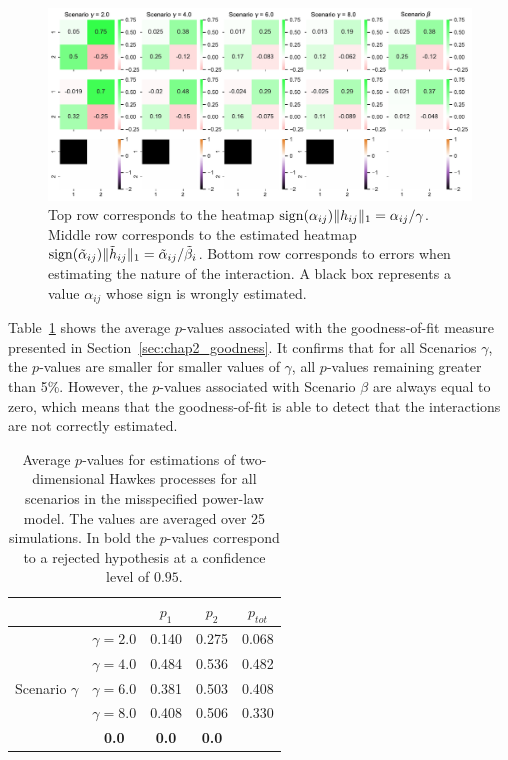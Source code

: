 {\begin{figure}[!ht]
     \centering
     \includegraphics[width=0.9\linewidth]{images/chapter3/heatmap_powerlaw_both.pdf}
     \caption{Top row corresponds to the heatmap $\operatorname{sign}(\alpha_{ij})\| h_{ij} \|_1 = \alpha_{ij}/\gamma$. Middle row corresponds to the estimated heatmap $\operatorname{sign}(\tilde \alpha_{ij})\| \tilde h_{ij}\|_1 = \tilde \alpha_{ij}/ \tilde\beta_{i}$. Bottom row corresponds to errors when estimating the nature of the interaction. A black box represents a value $\alpha_{ij}$ whose sign is wrongly estimated.}
     \label{fig:chap2_heatmap_powerlaw}
     \end{figure}}

Table~\ref{tab:chap2_p_values_powerlaw} shows the average $p$-values associated with the goodness-of-fit measure presented in Section~\ref{sec:chap2_goodness}. It confirms that for all Scenarios $\gamma$, the $p$-values are smaller for smaller values of $\gamma$, all $p$-values remaining greater than 5\%. However, the $p$-values associated with Scenario $\beta$ are always equal to zero, which means that the goodness-of-fit is able to detect that the interactions are not correctly estimated. 

\begin{table}[!ht]
    \begin{center}
    \centering
    \begin{tabular}{c|c|ccc}
         \multicolumn{2}{c}{} & $p_1$ & $p_2$ & $p_{tot}$\\
         \toprule
         \multirow{5}{*}{Scenario $\gamma$} & $\gamma = 2.0$ & 0.140 & 0.275 & 0.068\\
         & $\gamma = 4.0$ & 0.484 & 0.536 & 0.482\\
         & $\gamma = 6.0$ & 0.381 & 0.503 & 0.408\\
         & $\gamma = 8.0$ & 0.408 & 0.506 & 0.330\\
         \midrule
         \multicolumn{2}{c|}{Scenario $\beta$} & \textbf{0.0} & \textbf{0.0} & \textbf{0.0}
    \end{tabular}
    \caption{Average $p$-values for estimations of two-dimensional Hawkes processes for all scenarios in the misspecified power-law model. The values are averaged over 25 simulations. In bold the $p$-values correspond to a rejected hypothesis at a confidence level of $0.95$.}
    \label{tab:chap2_p_values_powerlaw}
    \end{center}
    \end{table}


